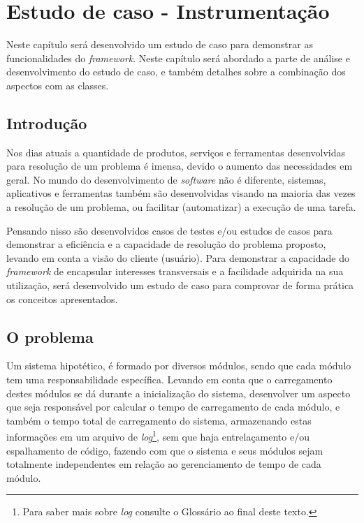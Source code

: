 \documentclass[tc,oneside]{iiufrgs}
\begin{document}
\chapter{Estudo de caso - Instrumentação}
\label{estudodecaso}

Neste capítulo será desenvolvido um estudo de caso para demonstrar as funcionalidades do \textit{framework}. Neste capítulo será abordado a parte de análise e desenvolvimento do estudo de caso, e também detalhes sobre a combinação dos aspectos com as classes.

\section{Introdução}

Nos dias atuais a quantidade de produtos, serviços e ferramentas desenvolvidas para resolução de um problema é imensa, devido o aumento das necessidades em geral. No mundo do desenvolvimento de \textit{software} não é diferente, sistemas, aplicativos e ferramentas também são desenvolvidas visando na maioria das vezes a resolução de um problema, ou facilitar (automatizar) a execução de uma tarefa. 

Pensando nisso são desenvolvidos casos de testes e/ou estudos de casos para demonstrar a eficiência e a capacidade de resolução do problema proposto, levando em conta a visão do cliente (usuário). Para demonstrar a capacidade do \textit{framework} de encapsular interesses transversais e a facilidade adquirida na sua utilização, será desenvolvido um estudo de caso para comprovar de forma prática os conceitos apresentados.

\section{O problema}

Um sistema hipotético, é formado por diversos módulos, sendo que cada módulo tem uma responsabilidade específica. Levando em conta que o carregamento destes módulos se dá durante a inicialização do sistema, desenvolver um aspecto que seja responsável por calcular o tempo de carregamento de cada módulo, e também o tempo total de carregamento do sistema, armazenando estas informações em um arquivo de \textit{log}\footnote{Para saber mais sobre \textit{log} consulte o Glossário ao final deste texto.}, sem que haja entrelaçamento e/ou espalhamento de código, fazendo com que o sistema e seus módulos sejam totalmente independentes em relação ao gerenciamento de tempo de cada módulo.
\end{document}
